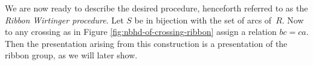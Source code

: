 \documentclass{article}
\theoremstyle{definition}
\begin{document}
We are now ready to describe the desired procedure, henceforth referred to as the \textit{Ribbon Wirtinger procedure}. Let $S$ be in bijection with the set of arcs of~$R$. Now to any crossing as in Figure \ref{fig:nbhd-of-crossing-ribbon} assign a relation $bc = ca$. Then the presentation arising from this construction is a presentation of the ribbon group, as we will later show.

%
%	
%	
%	
%
%	
%	
\end{document}
